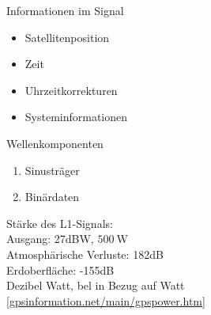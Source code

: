 \begin{multicols}{2}
    Informationen im Signal
    \begin{itemize}
        \item Satellitenposition
        \item Zeit
        \item Uhrzeitkorrekturen
        \item Systeminformationen
    \end{itemize}
    \columnbreak
    Wellenkomponenten
    \begin{enumerate}
        \item Sinusträger
        \item Binärdaten
    \end{enumerate}
\end{multicols}
Stärke des L1-Signals:\\
Ausgang: 27dBW, $\SI{500}{\watt}$\\
Atmosphärische Verluste: 182dB\\
Erdoberfläche: -155dB\\
Dezibel Watt, bel in Bezug auf Watt\\
{\small [\url{gpsinformation.net/main/gpspower.htm}]}
